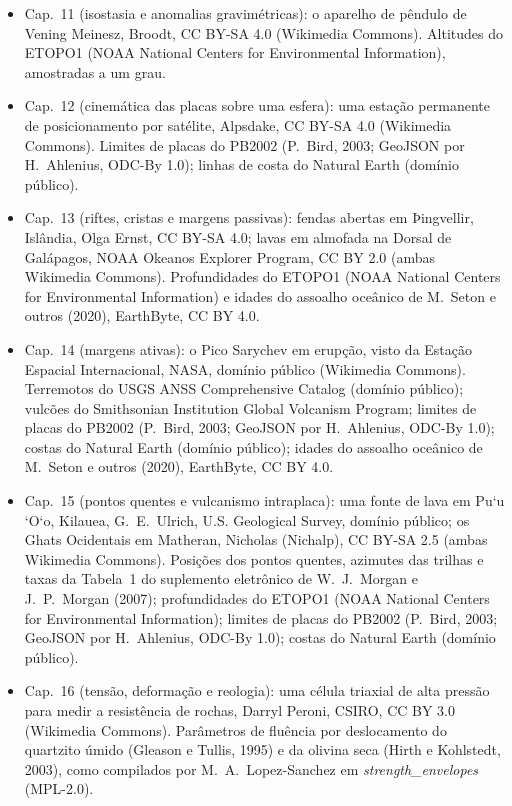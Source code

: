 \begin{itemize}
  \item Cap.~11 (isostasia e anomalias gravimétricas): o aparelho de pêndulo de Vening Meinesz, Broodt, CC BY-SA 4.0 (Wikimedia Commons). Altitudes do ETOPO1 (NOAA National Centers for Environmental Information), amostradas a um grau.
  \item Cap.~12 (cinemática das placas sobre uma esfera): uma estação permanente de posicionamento por satélite, Alpsdake, CC BY-SA 4.0 (Wikimedia Commons). Limites de placas do PB2002 (P.~Bird, 2003; GeoJSON por H.~Ahlenius, ODC-By 1.0); linhas de costa do Natural Earth (domínio público).
  \item Cap.~13 (riftes, cristas e margens passivas): fendas abertas em Þingvellir, Islândia, Olga Ernst, CC BY-SA 4.0; lavas em almofada na Dorsal de Galápagos, NOAA Okeanos Explorer Program, CC BY 2.0 (ambas Wikimedia Commons). Profundidades do ETOPO1 (NOAA National Centers for Environmental Information) e idades do assoalho oceânico de M.~Seton e outros (2020), EarthByte, CC BY 4.0.
  \item Cap.~14 (margens ativas): o Pico Sarychev em erupção, visto da Estação Espacial Internacional, NASA, domínio público (Wikimedia Commons). Terremotos do USGS ANSS Comprehensive Catalog (domínio público); vulcões do Smithsonian Institution Global Volcanism Program; limites de placas do PB2002 (P.~Bird, 2003; GeoJSON por H.~Ahlenius, ODC-By 1.0); costas do Natural Earth (domínio público); idades do assoalho oceânico de M.~Seton e outros (2020), EarthByte, CC BY 4.0.
  \item Cap.~15 (pontos quentes e vulcanismo intraplaca): uma fonte de lava em Pu\textquoteleft u \textquoteleft O\textquoteleft o, Kilauea, G.~E.~Ulrich, U.S. Geological Survey, domínio público; os Ghats Ocidentais em Matheran, Nicholas (Nichalp), CC BY-SA 2.5 (ambas Wikimedia Commons). Posições dos pontos quentes, azimutes das trilhas e taxas da Tabela~1 do suplemento eletrônico de W.~J.~Morgan e J.~P.~Morgan (2007); profundidades do ETOPO1 (NOAA National Centers for Environmental Information); limites de placas do PB2002 (P.~Bird, 2003; GeoJSON por H.~Ahlenius, ODC-By 1.0); costas do Natural Earth (domínio público).
  \item Cap.~16 (tensão, deformação e reologia): uma célula triaxial de alta pressão para medir a resistência de rochas, Darryl Peroni, CSIRO, CC BY 3.0 (Wikimedia Commons). Parâmetros de fluência por deslocamento do quartzito úmido (Gleason e Tullis, 1995) e da olivina seca (Hirth e Kohlstedt, 2003), como compilados por M.~A.~Lopez-Sanchez em \emph{strength\_envelopes} (MPL-2.0).

\end{itemize}
